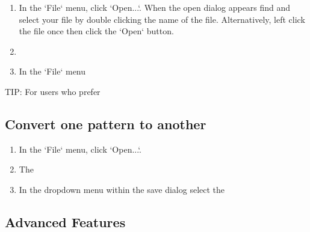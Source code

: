 \begin{enumerate}
\item In the `File` menu, click `Open...`. When the open dialog appears find and select your file by double clicking the name of the file. Alternatively, left click the file once then click the `Open` button.
\item
\item In the `File` menu
\end{enumerate}

TIP: For users who prefer

\subsection{Convert one pattern to another}

\begin{enumerate}
\item In the `File` menu, click `Open...`.
\item The
\item In the dropdown menu within the save dialog select the
\end{enumerate}

\subsection{Advanced Features}

